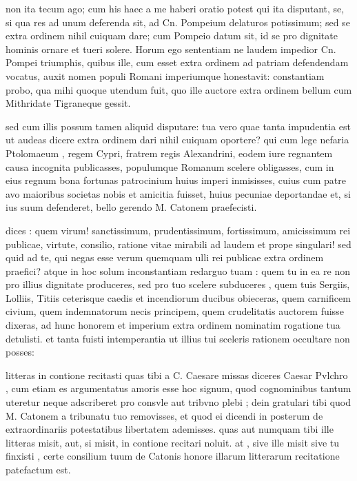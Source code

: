  non ita tecum ago; cum his haec a me haberi oratio potest qui ita disputant, se, si qua res ad unum deferenda sit, ad Cn. Pompeium delaturos potissimum; sed se extra ordinem nihil cuiquam dare; cum Pompeio datum sit, id se pro dignitate hominis ornare et tueri solere. Horum ego sententiam ne laudem impedior Cn. Pompei triumphis, quibus ille, cum esset extra ordinem ad patriam defendendam vocatus, auxit nomen populi Romani imperiumque honestavit: constantiam probo, qua mihi quoque utendum fuit, quo ille auctore extra ordinem bellum cum Mithridate Tigraneque gessit.

 sed cum illis possum tamen aliquid disputare: tua vero quae tanta impudentia est ut audeas dicere extra ordinem dari nihil cuiquam oportere? qui cum lege nefaria Ptolomaeum , regem Cypri, fratrem regis Alexandrini, eodem iure regnantem causa incognita publicasses, populumque Romanum scelere obligasses, cum in eius regnum bona fortunas patrocinium huius imperi inmisisses, cuius cum patre avo maioribus societas nobis et amicitia fuisset, huius pecuniae deportandae et, si ius suum defenderet, bello gerendo M. Catonem praefecisti.

 dices : quem virum! sanctissimum, prudentissimum, fortissimum, amicissimum rei publicae, virtute, consilio, ratione vitae mirabili ad laudem et prope singulari! sed quid ad te, qui negas esse verum quemquam ulli rei publicae extra ordinem praefici? atque in hoc solum inconstantiam redarguo tuam : quem tu in ea re non pro illius dignitate produceres, sed pro tuo scelere subduceres , quem tuis Sergiis, Lolliis, Titiis ceterisque caedis et incendiorum ducibus obieceras, quem carnificem civium, quem indemnatorum necis principem, quem crudelitatis auctorem fuisse dixeras, ad hunc honorem et imperium extra ordinem nominatim rogatione tua detulisti. et tanta fuisti intemperantia ut illius tui sceleris rationem occultare non posses:

 litteras in contione recitasti quas tibi a C. Caesare missas diceres Caesar Pvlchro , cum etiam es argumentatus amoris esse hoc signum, quod cognominibus tantum uteretur neque adscriberet pro consvle aut tribvno plebi ; dein gratulari tibi quod M. Catonem a tribunatu tuo removisses, et quod ei dicendi in posterum de extraordinariis potestatibus libertatem ademisses. quas aut numquam tibi ille litteras misit, aut, si misit, in contione recitari noluit. at , sive ille misit sive tu finxisti , certe consilium tuum de Catonis honore illarum litterarum recitatione patefactum est.

